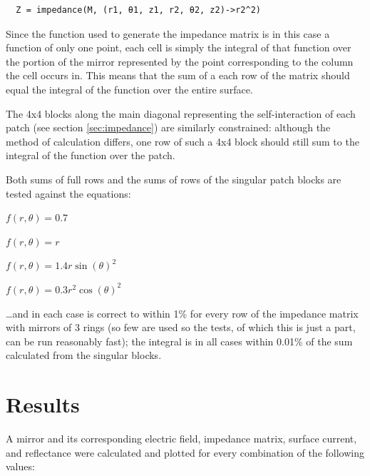 \documentclass[etd,senior,noacknowledgments]{BYUPhys}
\begin{document}
\begin{verbatim}
  Z = impedance(M, (r1, θ1, z1, r2, θ2, z2)->r2^2)
\end{verbatim}

Since the function used to generate the impedance matrix is in this case a function of only one point, each cell is simply the integral of that function over the portion of the mirror represented by the point corresponding to the column the cell occurs in. This means that the sum of a each row of the matrix should equal the integral of the function over the entire surface.

The 4x4 blocks along the main diagonal representing the self-interaction of each patch (see section \ref{sec:impedance}) are similarly constrained: although the method of calculation differs, one row of such a 4x4 block should still sum to the integral of the function over the patch.

Both sums of full rows and the sums of rows of the singular patch blocks are tested against the equations:

$f\left(r, \theta\right) = 0.7$

$f\left(r, \theta\right) = r$

$f\left(r, \theta\right) = 1.4 r \sin\left(\theta\right)^2$

$f\left(r, \theta\right) = 0.3 r^2 \cos\left(\theta\right)^2$

\ldots and in each case is correct to within 1\% for every row of the impedance matrix with mirrors of 3 rings (so few are used so the tests, of which this is just a part, can be run reasonably fast); the integral is in all cases within 0.01\% of the sum calculated from the singular blocks.







\chapter{Results}\label{chap:results}

A mirror and its corresponding electric field, impedance matrix, surface current, and reflectance were calculated and plotted for every combination of the following values:
\end{document}
